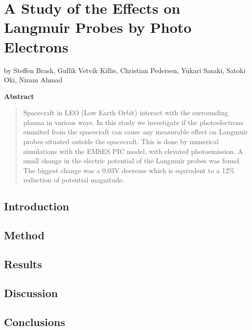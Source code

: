 \documentclass[captions=tableheading,twoside]{scrbook}
\newcommand{\agfauthor}[1]{%
	\begin{center}by #1\end{center}}
\newenvironment{Abstract}{\begin{center}\textbf{Abstract}\end{center}%
	\begin{quote}}{\end{quote}}
\begin{document}
\chapter*{A Study of the Effects on Langmuir Probes by Photo Electrons}
\agfauthor{Steffen Brask, Gullik Vetvik Killie, Christian Pedersen, Yukari Sasaki, Satoki Oki, Nizam Ahmad}

\begin{Abstract}
	Spacecraft in LEO (Low Earth Orbit) interact with the surrounding plasma in various ways.
 	In this study we investigate if the photoelectrons emmited from the spacecraft can cause any
	measurable effect on Langmuir probes situated outside the spacecraft. This is done by numerical
 	simulations with the EMSES PIC model, with elevated photoemission. A small change in the electric potential of the Langmuir probes was found. The biggest change was a 0.03V decrease which is equivalent to a 12\% reduction of potential magnitude.
\end{Abstract}

\section{Introduction}


\section{Method}


\section{Results}


\section{Discussion}


\section{Conclusions}



% 
\printbibliography
\end{document}
